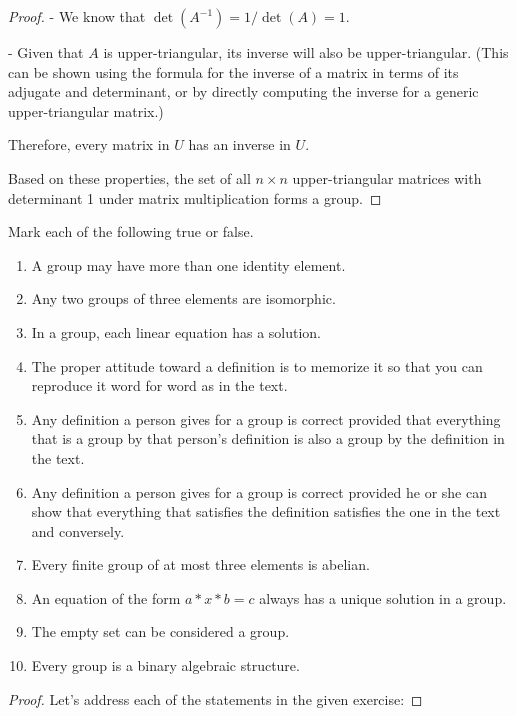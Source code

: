 \documentclass[12pt]{amsart}
\theoremstyle{definition}
\numberwithin{equation}{section}
\theoremstyle{plain}
\begin{document}
\begin{exercise}{17}
\begin{proof}
- We know that \( \det(A^{-1}) = 1/\det(A) = 1 \).
  
- Given that \( A \) is upper-triangular, its inverse will also be upper-triangular. (This can be shown using the formula for the inverse of a matrix in terms of its adjugate and determinant, or by directly computing the inverse for a generic upper-triangular matrix.)

Therefore, every matrix in \( U \) has an inverse in \( U \).

Based on these properties, the set of all \( n \times n \) upper-triangular matrices with determinant 1 under matrix multiplication forms a group.
        \end{proof}
    \end{exercise}
    \begin{exercise}{25}
        Mark each of the following true or false.
        \begin{enumerate}[label=(\alph*.)]
            \item A group may have more than one identity element.
            \item Any two groups of three elements are isomorphic.
            \item In a group, each linear equation has a solution.
            \item The proper attitude toward a definition is to memorize it so that you can reproduce it word for word as in the text.
            \item Any definition a person gives for a group is correct provided that everything that is a group by that person's definition is also a group by the definition in the text.
            \item Any definition a person gives for a group is correct provided he or she can show that everything that satisfies the definition satisfies the one in the text and conversely.
            \item Every finite group of at most three elements is abelian.
            \item An equation of the form $a*x*b=c$ always has a unique solution in a group.
            \item The empty set can be considered a group.
            \item Every group is a binary algebraic structure.
        \end{enumerate}
    
    \begin{proof}
        Let's address each of the statements in the given exercise:


\end{proof}
\end{exercise}
\end{document}
